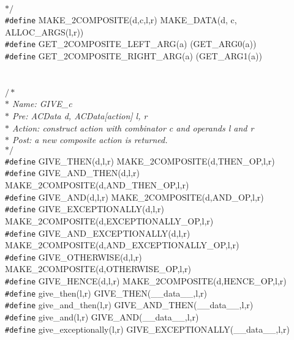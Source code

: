 \begin{flushleft}
{\hspace*{1\indentation}$\ast/$}\mbox{}\\
{\tt \#define} MAKE\_2COMPOSITE(d,c,l,r) MAKE\_DATA(d, c, ALLOC\_ARGS(l,r))\mbox{}\\
{\tt \#define} GET\_2COMPOSITE\_LEFT\_ARG(a) (GET\_ARG0(a))\mbox{}\\
{\tt \#define} GET\_2COMPOSITE\_RIGHT\_ARG(a) (GET\_ARG1(a))\mbox{}\\
\mbox{}\\
\mbox{}\\
{$/\ast$\it{}\mbox{}\\
\hspace*{1\indentation}$\ast$ Name: GIVE\_c\mbox{}\\
\hspace*{1\indentation}$\ast$ Pre: ACData d, ACData[action] l, r\mbox{}\\
\hspace*{1\indentation}$\ast$ Action: construct action with combinator c and operands l and r\mbox{}\\
\hspace*{1\indentation}$\ast$ Post: a new composite action is returned.\mbox{}\\
\hspace*{1\indentation}$\ast/$}\mbox{}\\
{\tt \#define} GIVE\_THEN(d,l,r) MAKE\_2COMPOSITE(d,THEN\_OP,l,r)\mbox{}\\
{\tt \#define} GIVE\_AND\_THEN(d,l,r) MAKE\_2COMPOSITE(d,AND\_THEN\_OP,l,r)\mbox{}\\
{\tt \#define} GIVE\_AND(d,l,r) MAKE\_2COMPOSITE(d,AND\_OP,l,r)\mbox{}\\
{\tt \#define} GIVE\_EXCEPTIONALLY(d,l,r) MAKE\_2COMPOSITE(d,EXCEPTIONALLY\_OP,l,r)\mbox{}\\
{\tt \#define} GIVE\_AND\_EXCEPTIONALLY(d,l,r) MAKE\_2COMPOSITE(d,AND\_EXCEPTIONALLY\_OP,l,r)\mbox{}\\
{\tt \#define} GIVE\_OTHERWISE(d,l,r) MAKE\_2COMPOSITE(d,OTHERWISE\_OP,l,r)\mbox{}\\
{\tt \#define} GIVE\_HENCE(d,l,r) MAKE\_2COMPOSITE(d,HENCE\_OP,l,r)\mbox{}\\
{\tt \#define} give\_then(l,r) GIVE\_THEN(\_\_data\_\_,l,r)\mbox{}\\
{\tt \#define} give\_and\_then(l,r) GIVE\_AND\_THEN(\_\_data\_\_,l,r)\mbox{}\\
{\tt \#define} give\_and(l,r) GIVE\_AND(\_\_data\_\_,l,r)\mbox{}\\
{\tt \#define} give\_exceptionally(l,r) GIVE\_EXCEPTIONALLY(\_\_data\_\_,l,r)\mbox{}\\

\end{flushleft}
